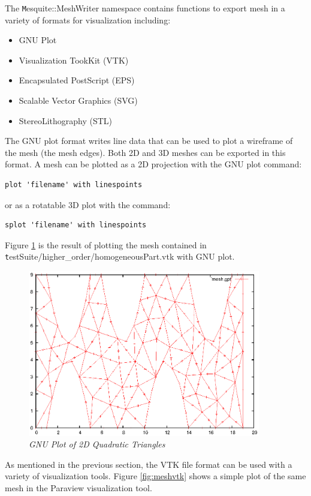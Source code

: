 The {\texttt Mesquite::MeshWriter} namespace contains functions to export mesh in a variety of formats for visualization including:
\begin{itemize}
\item GNU Plot
\item Visualization TookKit (VTK)
\item Encapsulated PostScript (EPS)
\item Scalable Vector Graphics (SVG)
\item StereoLithography (STL)
\end{itemize}
The GNU plot format writes line data that can be used to plot a wireframe of the mesh (the mesh edges).	 Both 2D and 3D meshes can be exported in this format.	A mesh can be plotted as a 2D projection with the GNU plot command:
\begin{verbatim}
plot 'filename' with linespoints
\end{verbatim}
or as a rotatable 3D plot with the command:
\begin{verbatim}
splot 'filename' with linespoints
\end{verbatim}
Figure \ref{fig:meshgpt} is the result of plotting the mesh contained in {\texttt testSuite/higher\_order/homogeneousPart.vtk} with GNU plot.

\begin{figure}[htb!]
\begin{center}
\includegraphics[width=4in]{mesh_gpt}
\caption{\em GNU Plot of 2D Quadratic Triangles \label{fig:meshgpt}}
\end{center}
\end{figure}

As mentioned in the previous section, the VTK file format can be used with a variety of visualization tools.  Figure \ref{fig:meshvtk} shows a simple plot of the same mesh in the Paraview visualization tool.

